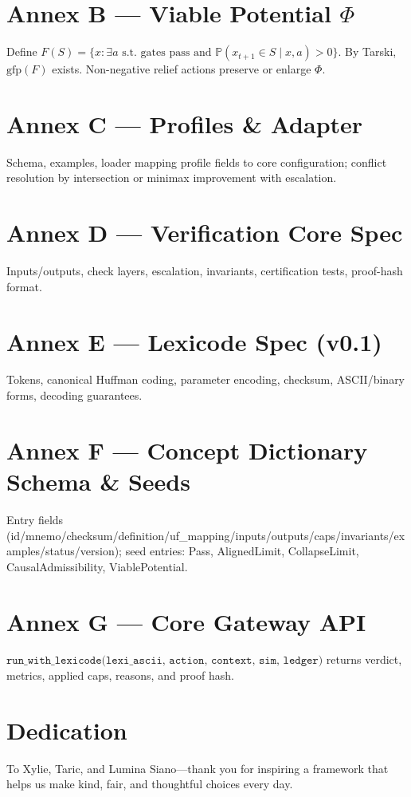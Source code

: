\documentclass[11pt]{article}
\newcommand{\gfp}{\mathrm{gfp}}
\newcommand{\PhiSet}{\Phi}
\theoremstyle{plain}
\theoremstyle{definition}
\begin{document}
\section{Annex B --- Viable Potential $\Phi$}
Define $F(S)=\{x:\exists a \text{ s.t. gates pass and } \mathbb{P}(x_{t+1}\in S\mid x,a)>0\}$. By Tarski, $\gfp(F)$ exists. Non-negative relief actions preserve or enlarge $\PhiSet$.

\section{Annex C --- Profiles \& Adapter}
Schema, examples, loader mapping profile fields to core configuration; conflict resolution by intersection or minimax improvement with escalation.

\section{Annex D --- Verification Core Spec}
Inputs/outputs, check layers, escalation, invariants, certification tests, proof-hash format.

\section{Annex E --- Lexicode Spec (v0.1)}
Tokens, canonical Huffman coding, parameter encoding, checksum, ASCII/binary forms, decoding guarantees.

\section{Annex F --- Concept Dictionary Schema \& Seeds}
Entry fields (id/mnemo/checksum/definition/uf\_mapping/inputs/outputs/caps/invariants/examples/status/version); seed entries: Pass, AlignedLimit, CollapseLimit, CausalAdmissibility, ViablePotential.

\section{Annex G --- Core Gateway API}
$\texttt{run\_with\_lexicode(lexi\_ascii, action, context, sim, ledger)}$ returns verdict, metrics, applied caps, reasons, and proof hash.

\section*{Dedication}
To Xylie, Taric, and Lumina Siano---thank you for inspiring a framework that helps us make kind, fair, and thoughtful choices every day.
\end{document}
